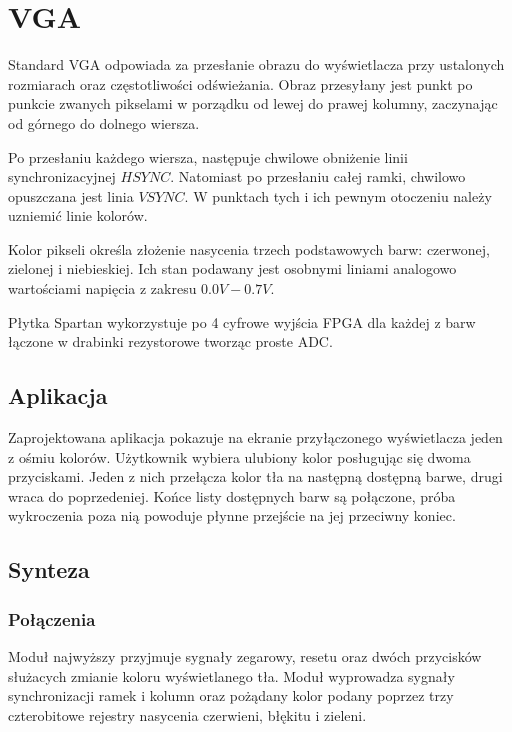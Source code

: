\documentclass[a4paper,12pt]{article}
\begin{document}
\newpage
\section{VGA}
Standard VGA odpowiada za przesłanie obrazu do wyświetlacza przy ustalonych rozmiarach oraz częstotliwości odświeżania. Obraz przesyłany jest punkt po punkcie zwanych pikselami w porządku od lewej do prawej kolumny, zaczynając od górnego do dolnego wiersza.

Po przesłaniu każdego wiersza, następuje chwilowe obniżenie linii synchronizacyjnej $HSYNC$. Natomiast po przesłaniu całej ramki, chwilowo opuszczana jest linia $VSYNC$. W punktach tych i ich pewnym otoczeniu należy uzniemić linie kolorów.

Kolor pikseli określa złożenie nasycenia trzech podstawowych barw: czerwonej, zielonej i niebieskiej. Ich stan podawany jest osobnymi liniami analogowo wartościami napięcia z zakresu $0.0V - 0.7V$.

Płytka Spartan wykorzystuje po 4 cyfrowe wyjścia FPGA dla każdej z barw łączone w drabinki rezystorowe tworząc proste ADC.

\subsection{Aplikacja}
Zaprojektowana aplikacja pokazuje na ekranie przyłączonego wyświetlacza jeden z ośmiu kolorów. Użytkownik wybiera ulubiony kolor posługując się dwoma przyciskami. Jeden z nich przełącza kolor tła na następną dostępną barwe, drugi wraca do poprzedeniej. Końce listy dostępnych barw są połączone, próba wykroczenia poza nią powoduje płynne przejście na jej przeciwny koniec.

\subsection{Synteza}

\subsubsection{Połączenia}

Moduł najwyższy przyjmuje sygnały zegarowy, resetu oraz dwóch przycisków służacych zmianie koloru wyświetlanego tła. Moduł wyprowadza sygnały synchronizacji ramek i kolumn oraz pożądany kolor podany poprzez trzy czterobitowe rejestry nasycenia czerwieni, błękitu i zieleni.
\end{document}
